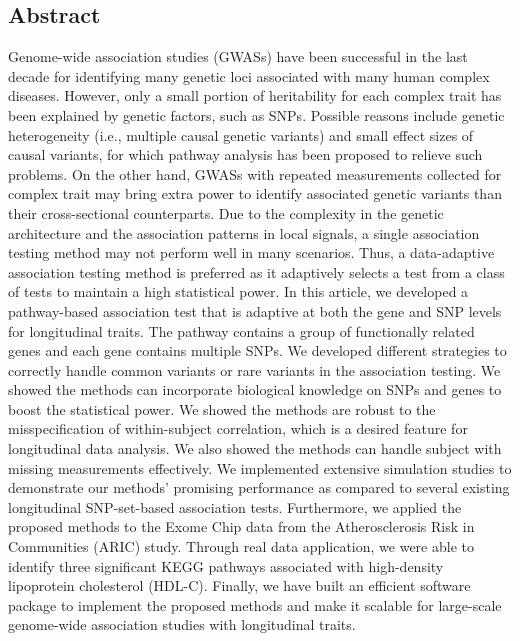 \documentclass[12pt]{article}
\begin{document}
\subsection*{Abstract}
Genome-wide association studies (GWASs) have been successful in the last decade for identifying many genetic loci associated with many human complex diseases. However, only a small portion of heritability for each complex trait has been explained by genetic factors, such as SNPs. Possible reasons include genetic heterogeneity (i.e., multiple causal genetic variants) and small effect sizes of causal variants, for which pathway analysis has been proposed to relieve such problems. On the other hand, GWASs with repeated measurements collected for complex trait may bring extra power to identify associated genetic variants than their cross-sectional counterparts. Due to the complexity in the genetic architecture and the association patterns in local signals, a single association testing method may not perform well in many scenarios. Thus, a data-adaptive association testing method is preferred as it adaptively selects a test from a class of tests to maintain a high statistical power. In this article, we developed a pathway-based association test that is adaptive at both the gene and SNP levels for longitudinal traits. The pathway contains a group of functionally related genes and each gene contains multiple SNPs. We developed different strategies to correctly handle common variants or rare variants in the association testing. We showed the methods can incorporate biological knowledge on SNPs and genes to boost the statistical power. We showed the methods are robust to the misspecification of within-subject correlation, which is a desired feature for longitudinal data analysis. We also showed the methods can handle subject with missing measurements effectively. We implemented extensive simulation studies to demonstrate our methods' promising performance as compared to several existing longitudinal SNP-set-based association tests. Furthermore, we applied the proposed methods to the Exome Chip data from the Atherosclerosis Risk in Communities (ARIC) study. Through real data application, we were able to identify three significant KEGG pathways associated with high-density lipoprotein cholesterol (HDL-C). Finally, we have built an efficient software package to implement the proposed methods and make it scalable for large-scale genome-wide association studies with longitudinal traits.%
\end{document}
